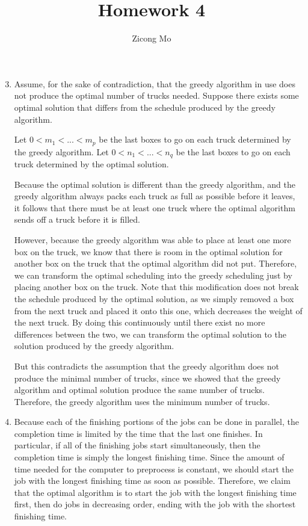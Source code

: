 \documentclass[oneside, 12pt]{article}
\title{Homework 4}
\author{Zicong Mo}
\begin{document}
\maketitle
\begin{enumerate}
\setcounter{enumi}{2}
\item
Assume, for the sake of contradiction, that the greedy algorithm in use does not produce the optimal number of trucks needed. Suppose there exists some optimal solution that differs from the schedule produced by the greedy algorithm.

Let $0 < m_1 < ... < m_p$ be the last boxes to go on each truck determined by the greedy algorithm. Let $0 < n_1 < ... < n_q $ be the last boxes to go on each truck determined by the optimal solution. 

Because the optimal solution is different than the greedy algorithm, and the greedy algorithm always packs each truck as full as possible before it leaves, it follows that there must be at least one truck where the optimal algorithm sends off a truck before it is filled. 

However, because the greedy algorithm was able to place at least one more box on the truck, we know that there is room in the optimal solution for another box on the truck that the optimal algorithm did not put. Therefore, we can transform the optimal scheduling into the greedy scheduling just by placing another box on the truck. Note that this modification does not break the schedule produced by the optimal solution, as we simply removed a box from the next truck and placed it onto this one, which decreases the weight of the next truck. By doing this continuously until there exist no more differences between the two, we can transform the optimal solution to the solution produced by the greedy algorithm.

But this contradicts the assumption that the greedy algorithm does not produce the minimal number of trucks, since we showed that the greedy algorithm and optimal solution produce the same number of trucks. Therefore, the greedy algorithm uses the minimum number of trucks.
\clearpage
\setcounter{enumi}{6}
\item
Because each of the finishing portions of the jobs can be done in parallel, the completion time is limited by the time that the last one finishes. In particular, if all of the finishing jobs start simultaneously, then the completion time is simply the longest finishing time. Since the amount of time needed for the computer to preprocess is constant, we should start the job with the longest finishing time as soon as possible. Therefore, we claim that the optimal algorithm is to start the job with the longest finishing time first, then do jobs in decreasing order, ending with the job with the shortest finishing time.


\end{enumerate}
\end{document}
